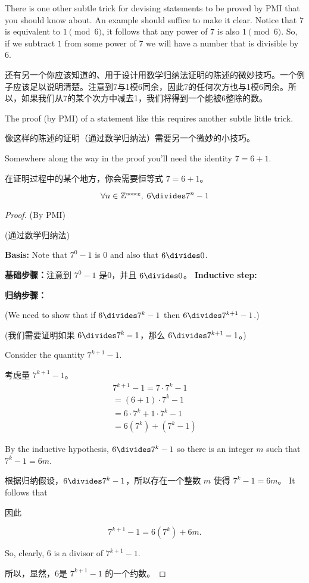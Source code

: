 There is one other subtle trick for devising statements to be
proved by PMI that you should know about.  An example should 
suffice to make it clear.  Notice that $7$ is equivalent to $1 \pmod{6}$,
it follows that any power of $7$ is also $1 \pmod{6}$.  So, if we subtract
$1$ from some power of 7 we will have a number that is divisible by $6$.

还有另一个你应该知道的、用于设计用数学归纳法证明的陈述的微妙技巧。一个例子应该足以说明清楚。注意到7与1模6同余，因此7的任何次方也与1模6同余。所以，如果我们从7的某个次方中减去1，我们将得到一个能被6整除的数。

The proof (by PMI) of a statement like this requires another subtle little
trick.

像这样的陈述的证明（通过数学归纳法）需要另一个微妙的小技巧。

Somewhere along the way in the proof you'll need the identity $7=6+1$.

在证明过程中的某个地方，你会需要恒等式 $7=6+1$。

\begin{thm}
\[ \forall n \in \Naturals, \; 6 \divides 7^n-1 \]
\end{thm}

\begin{proof} (By PMI)

(通过数学归纳法)

{\bf Basis:}  Note that $7^0-1$ is $0$ and also that $6 \divides 0$.

{\bf 基础步骤：}注意到 $7^0-1$ 是0，并且 $6 \divides 0$。
{\bf Inductive step:}  

{\bf 归纳步骤：}

\noindent (We need to show that if $6 \divides 7^k-1$ then $6 \divides 7^{k+1}-1$.)

\noindent (我们需要证明如果 $6 \divides 7^k-1$，那么 $6 \divides 7^{k+1}-1$。)

\noindent Consider the quantity $7^{k+1}-1$.

\noindent 考虑量 $7^{k+1}-1$。
\begin{gather*}
7^{k+1}-1 = 7 \cdot 7^k -1 \\
 = (6 + 1) \cdot 7^k - 1 \\
 = 6 \cdot 7^k + 1 \cdot 7^k - 1\\
 = 6(7^k) + (7^k - 1)
\end{gather*}

\noindent By the inductive hypothesis, $6 \divides 7^k - 1$ so there is
an integer $m$ such that $7^k - 1 = 6m$.

\noindent 根据归纳假设，$6 \divides 7^k - 1$，所以存在一个整数 $m$ 使得 $7^k - 1 = 6m$。
It follows that

因此

\[ 7^{k+1}-1 = 6(7^k) + 6m. \]

So, clearly, $6$ is a divisor of $7^{k+1}-1$.

所以，显然，6是 $7^{k+1}-1$ 的一个约数。
\end{proof}

